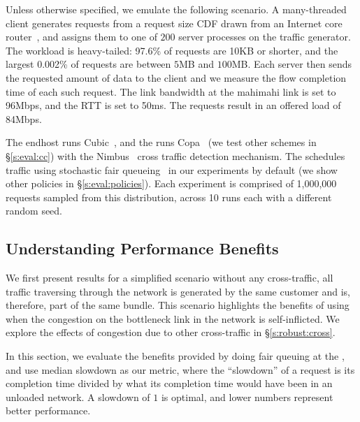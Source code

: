 Unless otherwise specified, we emulate the following scenario.
A many-threaded client generates requests from a request size CDF drawn from an Internet core router~\cite{caida-dataset}, and assigns them to one of $200$ server processes on the traffic generator.
The workload is heavy-tailed: 97.6\% of requests are 10KB or shorter, and the largest 0.002\% of requests are between $5$MB and $100$MB.
Each server then sends the requested amount of data to the client and we measure the flow completion time of each such request. 
The link bandwidth at the mahimahi link is set to 96Mbps, and the RTT is set to 50ms. The requests result in an offered load of 84Mbps. 

The endhost runs Cubic~\cite{cubic}, and the \inbox runs Copa~\cite{copa} (we test other schemes in \S\ref{s:eval:cc}) with the Nimbus~\cite{nimbus} cross traffic detection mechanism. The \inbox schedules traffic using stochastic fair queueing~\cite{sfq} in our experiments by default (we show other policies in \S\ref{s:eval:policies}). 
Each experiment is comprised of 1,000,000 requests sampled from this distribution, across 10 runs each with a different random seed.

\subsection{Understanding Performance Benefits}\label{s:eval:fct}

We first present results for a simplified scenario without any cross-traffic, \ie all traffic traversing through the network is generated by the same customer and is, therefore, part of the same bundle. 
This scenario highlights the benefits of using \name when the congestion on the bottleneck link in the network is self-inflicted. We explore the effects of congestion due to other cross-traffic in \S\ref{s:robust:cross}.


\newcommand{\baseline}{Status Quo\xspace}
\newcommand{\optimal}{In-Network\xspace}

In this section, we evaluate the benefits provided by doing fair queuing at the \name, and use median slowdown as our metric, where the ``slowdown'' of a request is its completion time divided by what its completion time would have been in an unloaded network. A slowdown of $1$ is optimal, and lower numbers represent better performance.

